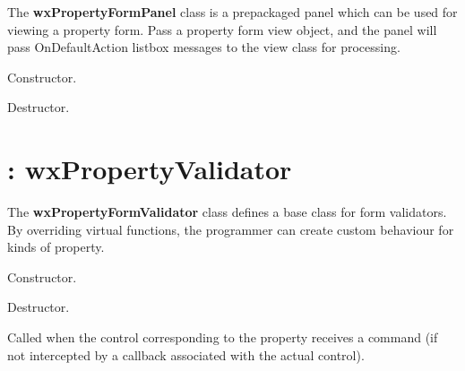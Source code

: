 The {\bf wxPropertyFormPanel} class is a prepackaged panel which can
be used for viewing a property form. Pass a property form view object, and the panel
will pass OnDefaultAction listbox messages to the view class for
processing.



Constructor.



Destructor.



\section{: wxPropertyValidator}\label{wxpropertyformvalidatir}


The {\bf wxPropertyFormValidator} class defines a base class for form validators. By overriding virtual functions,
the programmer can create custom behaviour for kinds of property.



Constructor.



Destructor.



Called when the control corresponding to the property receives a command (if not intercepted
by a callback associated with the actual control).

